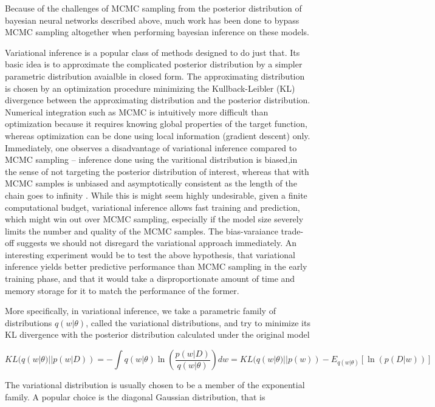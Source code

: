 \documentclass{book}
\begin{document}
\begin{enumerate}
Because of the challenges of MCMC sampling from the posterior distribution of
bayesian neural networks described above, much work has been done to bypass MCMC
sampling altogether when performing bayesian inference on these models.

Variational inference \cite{jordan1999introduction,fox2012tutorial,blei2016variational} is a popular class of methods designed to do just that. Its basic idea is to approximate the complicated posterior distribution by a simpler parametric distribution avaialble in closed form. The approximating distribution is chosen by an optimization procedure minimizing the Kullback-Leibler (KL) divergence between the approximating distribution and the posterior distribution. Numerical integration such as MCMC is intuitively more difficult than optimization because it requires knowing global properties of the target function, whereas optimization can be done using local information (gradient descent) only. Immediately, one observes a disadvantage of variational inference compared to MCMC sampling -- inference done using the varitional distribution is biased,in the sense of not targeting the posterior distribution of interest, whereas that with MCMC samples is unbiased and asymptotically consistent as the length of the chain goes to infinity \cite{robert2013monte}. While this is might seem highly undesirable, given a finite computational budget, variational inference allows fast training and prediction, which might win out over MCMC sampling, especially if the model size severely limits the number and quality of the MCMC samples. The bias-varaiance trade-off suggests we should not disregard the variational approach immediately. An interesting experiment would be to test the above hypothesis, that variational inference yields better predictive performance than MCMC sampling in the early training phase, and that it would take a disproportionate amount of time and memory storage for it to match the performance of the former.

More specifically, in variational inference, we take a parametric family of distributions $q(w|\theta)$, called the variational distributions, and try to minimize its KL divergence with the posterior distribution calculated under the original model

\[ KL(q(w|\theta) || p(w|D)) = -\int q(w|\theta) \ln(\frac{p(w|D)}{q(w|\theta)}) dw = KL(q(w|\theta)||p(w)) - E_{q(w|\theta)}[\ln(p(D|w))] \]

The variational distribution is usually chosen to be a member of the exponential
family. A popular choice is the diagonal Gaussian distribution, that is 


\end{enumerate}
\end{document}
